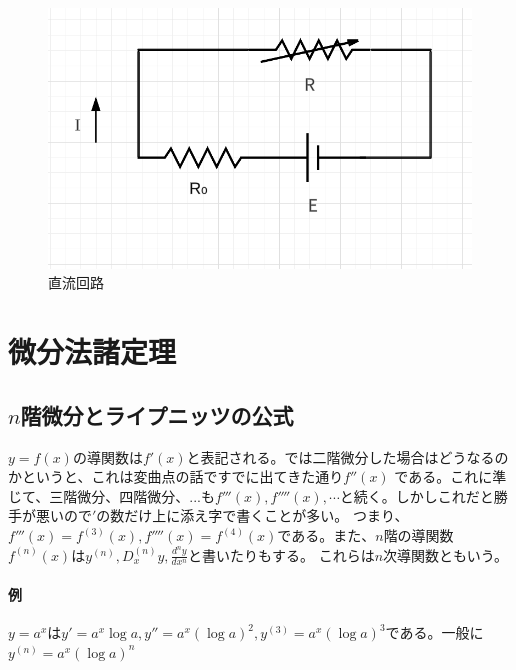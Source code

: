 \documentclass[a4j,dvipdfmx]{jsarticle}
\begin{document}
                \begin{figure}[h]
                    \centering
                    \includegraphics[scale=0.5]{img/QuuNote/tyokuryuukairo.png}
                    \caption{直流回路}\label{fig:直流回路}
                \end{figure}
            \clearpage
            \section{微分法諸定理}
                \subsection{$n$階微分とライプニッツの公式}
                    $y=f(x)$の導関数は$f'(x)$と表記される。では二階微分した場合はどうなるのかというと、これは変曲点の話ですでに出てきた通り$f''(x)$
                    である。これに準じて、三階微分、四階微分、...も$f'''(x),f''''(x),\cdots$と続く。しかしこれだと勝手が悪いので$'$の数だけ上に添え字で書くことが多い。
                    つまり、$f'''(x)=f^{(3)}(x),f''''(x)=f^{(4)}(x)$である。また、$n$階の導関数$f^{(n)}(x)$は$y^{(n)},D_x^{(n)} y,\displaystyle \frac{d^n y}{dx^n}$と書いたりもする。
                    これらは$n$次導関数ともいう。

                    \paragraph{例}$y=a^{x}$は$y'=a^x\log a,y''=a^x(\log a)^2,y^{(3)}=a^x(\log a)^3$である。一般に$y^{(n)}=a^x(\log a)^n$\\
\end{document}
